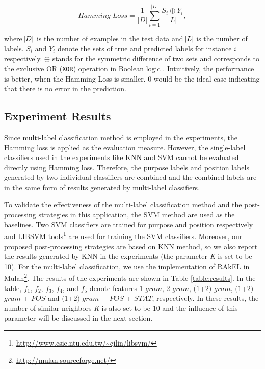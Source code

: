 \documentclass[letterpaper]{article}
\begin{document}
\begin{equation}
    Hamming\; Loss = \frac{1}{|D|} \sum\limits_{i=1}^{|D|} \frac{S_i \oplus Y_i}{|L|},
\end{equation}

where $\abs{D}$ is the number of examples in the test data and $\abs{L}$ is the number of labels. $S_i$ and $Y_i$ denote the sets of true and predicted labels for instance $i$ respectively. $\oplus$ stands for the symmetric difference of two sets and corresponds to the exclusive OR (\texttt{XOR}) operation in Boolean logic \cite{tsoumakas2007multi}. Intuitively, the performance is better, when the Hamming Loss is smaller. $0$ would be the ideal case indicating that there is no error in the prediction. 

\subsection{Experiment Results}
\label{subsec:exp_results}
Since multi-label classification method is employed in the experiments, the Hamming loss is applied as the evaluation measure. However, the single-label classifiers used in the experiments like KNN and SVM cannot be evaluated directly using Hamming loss. Therefore, the purpose labels and position labels generated by two individual classifiers are combined and the combined labels are in the same form of results generated by multi-label classifiers.

To validate the effectiveness of the multi-label classification method and the post-processing strategies in this application, the SVM method are used as the baselines. Two SVM classifiers are trained for purpose and position respectively and LIBSVM tools\footnote{\url{http://www.csie.ntu.edu.tw/~cjlin/libsvm/}} are used for training the SVM classifiers. Moreover, our proposed post-processing strategies are based on KNN method, so we also report the results generated by KNN in the experiments (the parameter \textit{K} is set to be 10). For the multi-label classification, we use the implementation of RAkEL in Mulan\footnote{\url{http://mulan.sourceforge.net/}}. The results of the experiments are shown in Table \ref{table:results}. In the table, $f_1$, $f_2$, $f_3$, $f_4$, and $f_5$ denote features $1$-$gram$, $2$-$gram$, $(1$+$2)$-$gram$, $(1$+$2)$-$gram$ + $POS$ and $(1$+$2)$-$gram$ + $POS$ + $STAT$, respectively. In these results, the number of similar neighbors \textit{K} is also set to be 10 and the influence of this parameter will be discussed in the next section.
\end{document}
